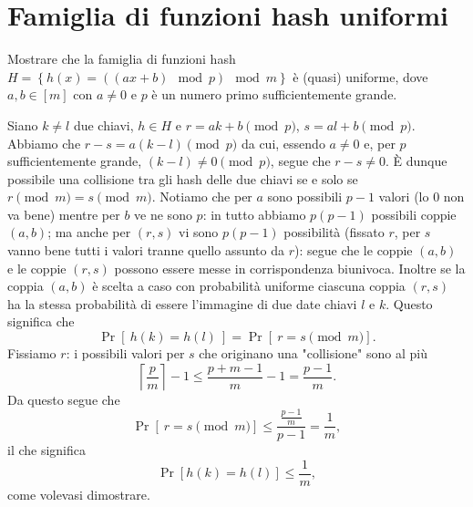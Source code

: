\chapter{Famiglia di funzioni hash uniformi}

\begin{problem*}
    Mostrare che la famiglia di funzioni hash 
    \(H = \left\{h(x) = ((ax + b ) \mod p) \mod m\right\}\) \`e (quasi) uniforme, dove 
    \(a,b\in [m]\) con \(a\neq 0\) e \(p\) \`e un numero primo sufficientemente grande.
\end{problem*}
Siano $k\neq l$ due chiavi, $h\in H$ e $r=ak+b \pmod p$, $s=al+b\pmod p$. Abbiamo che $r-s = a(k-l) \pmod p$ da cui, essendo $a\neq0$ e, per $p$ sufficientemente grande, $(k-l)\neq 0 \pmod p$, segue che $r-s\neq0$.\newline
È dunque possibile una collisione tra gli hash delle due chiavi se e solo se $r \pmod m = s \pmod m$.\newline
Notiamo che per $a$ sono possibili $p-1$ valori (lo $0$ non va bene) mentre per $b$ ve ne sono $p$: in tutto abbiamo $p(p-1)$ possibili coppie $(a, b)$; ma anche per $(r, s)$ vi sono $p(p-1)$ possibilità (fissato $r$, per $s$ vanno bene tutti i valori tranne quello assunto da $r$): segue che le coppie $(a, b)$ e le coppie $(r, s)$ possono essere messe in corrispondenza biunivoca. Inoltre se la coppia $(a, b)$ è scelta a caso con probabilità uniforme ciascuna coppia $(r, s)$ ha la stessa probabilità di essere l'immagine di due date chiavi $l$ e $k$. Questo significa che \[\Pr[~h(k)=h(l)~]=\Pr[~r = s \pmod m].\]
Fissiamo $r$: i possibili valori per $s$ che originano una "collisione" sono al più \[\left\lceil \frac{p}{m} \right\rceil-1 \le \frac{p+m-1}{m} - 1= \frac{p-1}{m}.\]
Da questo segue che \[\Pr[~r=s\pmod m] \le \frac{\frac{p-1}{m}}{p-1}=\frac{1}{m},\] il che significa \[\Pr[h(k)=h(l)]\le\frac{1}{m},\] come volevasi dimostrare.

